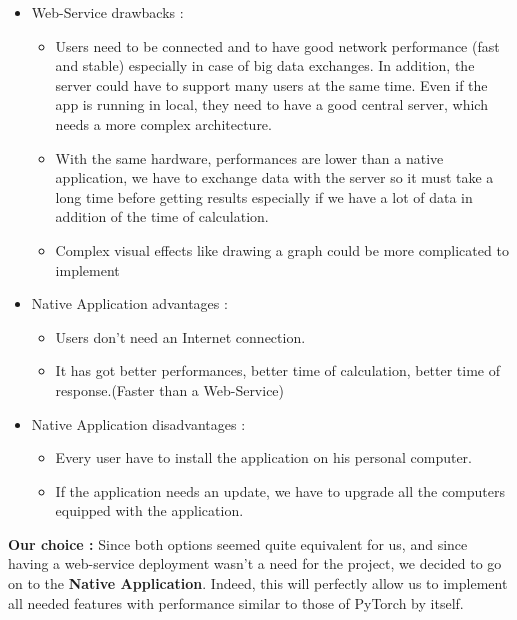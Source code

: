  
 \begin{itemize}
    \item Web-Service drawbacks :
    \begin{itemize}
         \item Users need to be connected and to have good network performance (fast and stable) especially in case of big data exchanges. In addition, the server could have to support many users at the same time. Even if the app is running in local, they need to have a good central server, which needs a more complex architecture.
        \item With the same hardware, performances are lower than a native application, we have to exchange data with the server so it must take a long time before getting results especially if we have a lot of data in addition of the time of calculation.
        \item Complex visual effects like drawing a graph could be more complicated to implement
        
    \end{itemize}
\end{itemize}

  \begin{itemize}
    \item Native Application advantages :
    \begin{itemize}
        \item Users don't need an Internet connection.
        \item It has got better performances, better time of calculation, better time of response.(Faster than a Web-Service)
    \end{itemize}
\end{itemize}
\begin{itemize}
    \item Native Application disadvantages :
    \begin{itemize}
        \item Every user have to install the application on his personal computer.
         \item If the application needs an update, we have to upgrade all the computers equipped with the application.
    \end{itemize}
\end{itemize}

\textbf{Our choice :}
Since both options seemed quite equivalent for us, and since having a web-service deployment wasn't a need for the project, we decided to go on to the \textbf{Native Application}. Indeed, this will perfectly allow us to implement all needed features with performance similar to those of PyTorch by itself.

